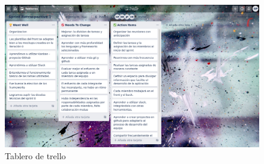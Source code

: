 \documentclass[a4paper,10 pt]{article}
\begin{document}
\begin{figure}[H]
    \centering
    \includegraphics[scale = 0.25]{images/tablero.png}
    \caption{Tablero de trello}
    \label{f01}
\end{figure}{}
\end{document}
